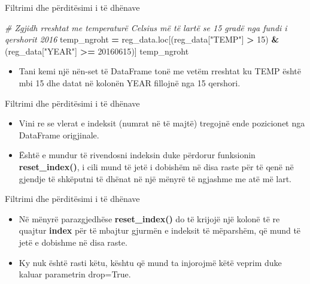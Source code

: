 \documentclass[
  ignorenonframetext,
]{beamer}
\newenvironment{Shaded}{\begin{snugshade}}{\end{snugshade}}
\newcommand{\CommentTok}[1]{\textcolor[rgb]{0.56,0.35,0.01}{\textit{#1}}}
\newcommand{\DecValTok}[1]{\textcolor[rgb]{0.00,0.00,0.81}{#1}}
\newcommand{\NormalTok}[1]{#1}
\newcommand{\OperatorTok}[1]{\textcolor[rgb]{0.81,0.36,0.00}{\textbf{#1}}}
\newcommand{\StringTok}[1]{\textcolor[rgb]{0.31,0.60,0.02}{#1}}
\providecommand{\tightlist}{%
  \setlength{\itemsep}{0pt}\setlength{\parskip}{0pt}}
\begin{document}
\begin{frame}[fragile]{Filtrimi dhe përditësimi i të dhënave}
\protect\hypertarget{filtrimi-dhe-puxebrdituxebsimi-i-tuxeb-dhuxebnave-3}{}
\begin{Shaded}
\begin{Highlighting}[]
\CommentTok{\# Zgjidh rreshtat me temperaturë Celsius më të lartë se 15 gradë nga fundi i qershorit 2016}
\NormalTok{temp\_ngroht }\OperatorTok{=}\NormalTok{ reg\_data.loc[(reg\_data[}\StringTok{"TEMP"}\NormalTok{] }\OperatorTok{\textgreater{}} \DecValTok{15}\NormalTok{) }\OperatorTok{\&}\NormalTok{ (reg\_data[}\StringTok{"YEAR"}\NormalTok{] }\OperatorTok{\textgreater{}=} \DecValTok{20160615}\NormalTok{)]}
\NormalTok{temp\_ngroht}
\end{Highlighting}
\end{Shaded}

\begin{itemize}
\tightlist
\item
  Tani kemi një nën-set të DataFrame tonë me vetëm rreshtat ku TEMP
  është mbi 15 dhe datat në kolonën YEAR fillojnë nga 15 qershori.
\end{itemize}
\end{frame}

\begin{frame}{Filtrimi dhe përditësimi i të dhënave}
\protect\hypertarget{filtrimi-dhe-puxebrdituxebsimi-i-tuxeb-dhuxebnave-4}{}
\begin{itemize}
\item
  Vini re se vlerat e indeksit (numrat në të majtë) tregojnë ende
  pozicionet nga DataFrame origjinale.
\item
  Është e mundur të rivendosni indeksin duke përdorur funksionin
  \textbf{reset\_index()}, i cili mund të jetë i dobishëm në disa raste
  për të qenë në gjendje të shkëputni të dhënat në një mënyrë të
  ngjashme me atë më lart.
\end{itemize}
\end{frame}

\begin{frame}{Filtrimi dhe përditësimi i të dhënave}
\protect\hypertarget{filtrimi-dhe-puxebrdituxebsimi-i-tuxeb-dhuxebnave-5}{}
\begin{itemize}
\item
  Në mënyrë parazgjedhëse \textbf{reset\_index()} do të krijojë një
  kolonë të re quajtur \textbf{index} për të mbajtur gjurmën e indeksit
  të mëparshëm, që mund të jetë e dobishme në disa raste.
\item
  Ky nuk është rasti këtu, kështu që mund ta injorojmë këtë veprim duke
  kaluar parametrin drop=True.
\end{itemize}
\end{frame}
\end{document}

